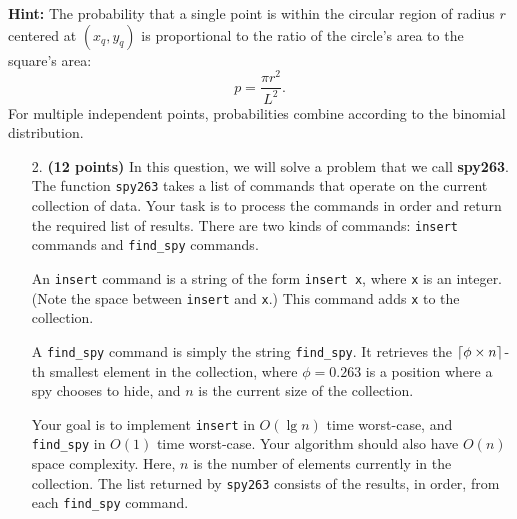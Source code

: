 \documentclass{assignment-263}
\begin{document}
\noindent \textbf{Hint:} The probability that a single point is within the circular region of radius $r$ centered at $(x_q, y_q)$ is proportional to the ratio of the circle's area to the square's area:
\[
p = \frac{\pi r^2}{L^2}.
\]
For multiple independent points, probabilities combine according to the binomial distribution.

\program

\begin{enumerate}
\item[2.] \textbf{(12 points)}
    In this question, we will solve a problem that we call {\bf spy263}.
    The function \verb|spy263| takes a list of commands that
    operate on the current collection of data.
    Your task is to process the commands in order and return the required list of results.
    There are two kinds of commands: \verb|insert| commands and \verb|find_spy| commands.

    An \verb|insert| command is a string of the form \verb|insert x|,
    where \verb|x| is an integer. (Note the space between \verb|insert| and \verb|x|.)
    This command adds \verb|x| to the collection.

    A \verb|find_spy| command is simply the string \verb|find_spy|.
    It retrieves the $\left \lceil \phi\times n \right \rceil$-th smallest element in the collection, where 
    $\phi=0.263$ is a position where a spy chooses to hide,
    and $n$ is the current size of the collection.

    Your goal is to implement \verb|insert| in $O(\lg n)$ time worst-case, and 
    \verb|find_spy| in $O(1)$ time worst-case.
    Your algorithm should also have $O(n)$ space complexity.
    Here, $n$ is the number of elements currently in the collection.
    The list returned by \verb|spy263| consists of the results, in order,
    from each \verb|find_spy| command.


\end{enumerate}
\end{document}
